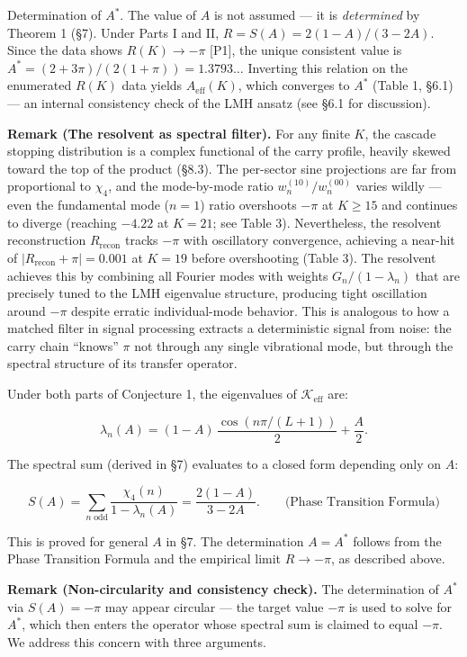 \documentclass[
  11pt,
]{article}
\begin{document}
Determination of \(A^{\ast}\). The value of \(A\) is not assumed --- it is
\emph{determined} by Theorem 1 (§7). Under Parts I and II,
\(R = S(A) = 2(1-A)/(3-2A)\). Since the data shows \(R(K) \to -\pi\) {[}P1{]},
the unique consistent value is
\(A^{\ast} = (2 + 3\pi)/(2(1+\pi)) = 1.3793\ldots\) Inverting this relation on
the enumerated \(R(K)\) data yields \(A_{\mathrm{eff}}(K)\), which converges to
\(A^{\ast}\) (Table 1, §6.1) --- an internal consistency check of the LMH ansatz
(see §6.1 for discussion).

\textbf{Remark (The resolvent as spectral filter).} For any finite \(K\), the
cascade stopping distribution is a complex functional of the carry profile,
heavily skewed toward the top of the product (§8.3). The per-sector sine
projections are far from proportional to \(\chi_4\), and the mode-by-mode ratio
\(w_n^{(10)}/w_n^{(00)}\) varies wildly --- even the fundamental mode (\(n=1\))
ratio overshoots \(-\pi\) at \(K \geq 15\) and continues to diverge (reaching
\(-4.22\) at \(K = 21\); see Table 3). Nevertheless, the resolvent
reconstruction \(R_{\mathrm{recon}}\) tracks \(-\pi\) with oscillatory
convergence, achieving a near-hit of \(|R_{\mathrm{recon}} + \pi| = 0.001\) at
\(K = 19\) before overshooting (Table 3). The resolvent achieves this by
combining all Fourier modes with weights \(G_n/(1-\lambda_n)\) that are
precisely tuned to the LMH eigenvalue structure, producing tight oscillation
around \(-\pi\) despite erratic individual-mode behavior. This is analogous to
how a matched filter in signal processing extracts a deterministic signal from
noise: the carry chain ``knows'' \(\pi\) not through any single vibrational
mode, but through the spectral structure of its transfer operator.

Under both parts of Conjecture 1, the eigenvalues of
\(\mathcal{K}_{\mathrm{eff}}\) are:

\[\lambda_n(A) = (1 - A)\,\frac{\cos(n\pi/(L+1))}{2} + \frac{A}{2}.\]

The spectral sum (derived in §7) evaluates to a closed form depending only on
\(A\):

\[S(A) = \sum_{n\;\mathrm{odd}} \frac{\chi_4(n)}{1 - \lambda_n(A)} = \frac{2(1-A)}{3 - 2A}. \qquad \text{(Phase Transition Formula)}\]

This is proved for general \(A\) in §7. The determination \(A = A^{\ast}\)
follows from the Phase Transition Formula and the empirical limit
\(R \to -\pi\), as described above.

\textbf{Remark (Non-circularity and consistency check).} The determination of
\(A^{\ast}\) via \(S(A) = -\pi\) may appear circular --- the target value
\(-\pi\) is used to solve for \(A^{\ast}\), which then enters the operator whose
spectral sum is claimed to equal \(-\pi\). We address this concern with three
arguments.
\end{document}
